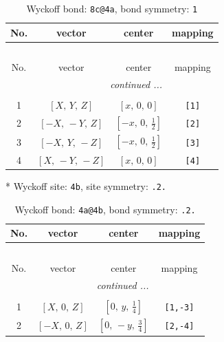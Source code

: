 \documentclass[fleqn,8pt]{jsarticle}
\begin{document}
\renewcommand{\arraystretch}{1.2}
\begin{longtable}{cccc}
\caption{Wyckoff bond: {\tt 8c@4a}, bond symmetry: {\tt 1}}
 \\
 \hline \hline
No. & vector & center & mapping \\ \hline \endfirsthead

\multicolumn{3}{l}{\tablename\ \thetable{}} \\
 \hline \hline
No. & vector & center & mapping \\ \hline \endhead

 \hline \hline
\multicolumn{3}{r}{\footnotesize\it continued ...} \\ \endfoot

 \hline \hline
\multicolumn{3}{r}{} \\ \endlastfoot

1 & $\left[ X,\, Y,\, Z \right]$ & $\left[ x,\, 0,\, 0 \right]$ & {\tt [1]} \\ \hline
2 & $\left[ - X,\, - Y,\, Z \right]$ & $\left[ - x,\, 0,\, \frac{1}{2} \right]$ & {\tt [2]} \\ \hline
3 & $\left[ - X,\, Y,\, - Z \right]$ & $\left[ - x,\, 0,\, \frac{1}{2} \right]$ & {\tt [3]} \\ \hline
4 & $\left[ X,\, - Y,\, - Z \right]$ & $\left[ x,\, 0,\, 0 \right]$ & {\tt [4]} \\
\end{longtable}
* Wyckoff site: {\tt 4b}, site symmetry: {\tt .2.}
\renewcommand{\arraystretch}{1.2}
\begin{longtable}{cccc}
\caption{Wyckoff bond: {\tt 4a@4b}, bond symmetry: {\tt .2.}}
 \\
 \hline \hline
No. & vector & center & mapping \\ \hline \endfirsthead

\multicolumn{3}{l}{\tablename\ \thetable{}} \\
 \hline \hline
No. & vector & center & mapping \\ \hline \endhead

 \hline \hline
\multicolumn{3}{r}{\footnotesize\it continued ...} \\ \endfoot

 \hline \hline
\multicolumn{3}{r}{} \\ \endlastfoot

1 & $\left[ X,\, 0,\, Z \right]$ & $\left[ 0,\, y,\, \frac{1}{4} \right]$ & {\tt [1,-3]} \\ \hline
2 & $\left[ - X,\, 0,\, Z \right]$ & $\left[ 0,\, - y,\, \frac{3}{4} \right]$ & {\tt [2,-4]} \\
\end{longtable}
\end{document}
